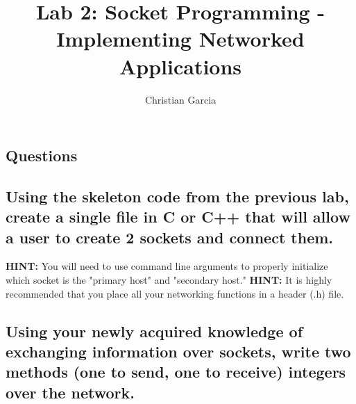 \documentclass{article}
\title{Lab 2: Socket Programming - Implementing Networked Applications}
\author{Christian Garcia}
\begin{document}
	\maketitle
	
	\begin{Huge}
		\section{Questions}
	\end{Huge}
	
	\begin{Large}
		\subsection{\textbf{Using the skeleton code from the previous lab, create a single file in C or C++ that will allow a user to create 2 sockets and connect them.}}
	\end{Large}
	\textbf{HINT:} You will need to use command line arguments to properly initialize which socket is the "primary host" and "secondary host."
	\linebreak{}
	\textbf{HINT:} It is highly recommended that you place all your networking functions in a header (.h) file. 
	\vspace{72pt}
	
	\begin{Large}
		\subsection{\textbf{Using your newly acquired knowledge of exchanging information over sockets, write two methods (one to send, one to receive) integers over the network.}}
	\end{Large}
	\pagebreak{}
	
\end{document}
